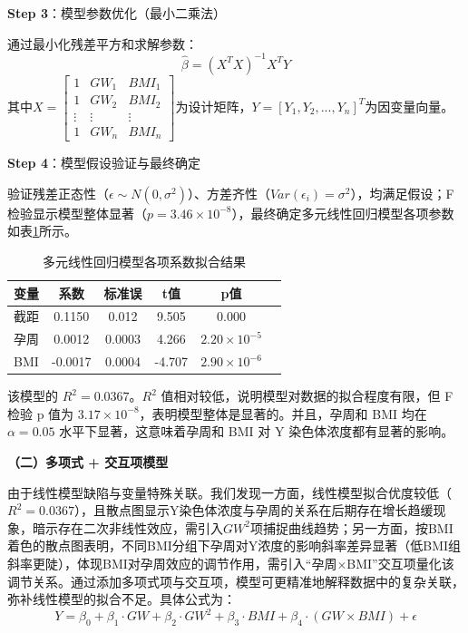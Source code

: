 \documentclass[withoutpreface,bwprint]{cumcmthesis} %
\begin{document}
\textbf{Step 3}：模型参数优化（最小二乘法）

通过最小化残差平方和求解参数：
\begin{equation}
    \hat{\beta} = (X^TX)^{-1}X^TY
\end{equation}
其中$X = \begin{bmatrix} 1 & GW_1 & BMI_1 \\ 1 & GW_2 & BMI_2 \\ \vdots & \vdots & \vdots \\ 1 & GW_n & BMI_n \end{bmatrix}$为设计矩阵，$Y = [Y_1, Y_2, ..., Y_n]^T$为因变量向量。  

\textbf{Step 4}：模型假设验证与最终确定

  验证残差正态性（$\epsilon \sim N(0, \sigma^2)$）、方差齐性（$Var(\epsilon_i) = \sigma^2$），均满足假设；F检验显示模型整体显著（$p=3.46 \times 10^{-8}$），最终确定多元线性回归模型各项参数如表\ref{tab:多元线性回归模型各项系数拟合结果}所示。


\begin{table}[H]
    \centering  %
    \caption{多元线性回归模型各项系数拟合结果}  %
    \label{tab:多元线性回归模型各项系数拟合结果}  %
    \begin{threeparttable}
        \begin{tabularx}{0.55\textwidth}{l c c c c c}
            \toprule[1.5pt]
            \textbf{变量} & \textbf{系数} & \textbf{标准误} & \textbf{t值} & \textbf{p值}\\ 
            \midrule[1pt]
             截距 & 0.1150 & 0.012 & 9.505 & 0.000  \\
            孕周 & 0.0012 & 0.0003 & 4.266 & $2.20 \times 10^{-5}$  \\
            BMI  &-0.0017 & 0.0004  &-4.707 & $2.90 \times 10^{-6}$  \\

            \bottomrule[1.5pt]
        \end{tabularx}
    \end{threeparttable}
\end{table}

该模型的 $R^2 = 0.0367$。$R^2$ 值相对较低，说明模型对数据的拟合程度有限，但 F 检验 p 值为 $3.17 \times 10^{-8}$，表明模型整体是显著的。并且，孕周和 BMI 均在 $\alpha = 0.05$ 水平下显著，这意味着孕周和 BMI 对 Y 染色体浓度都有显著的影响。

\textbf{（二）多项式 + 交互项模型}

由于线性模型缺陷与变量特殊关联。我们发现一方面，线性模型拟合优度较低（$R^2=0.0367$），且散点图显示Y染色体浓度与孕周的关系在后期存在增长趋缓现象，暗示存在二次非线性效应，需引入$GW^2$项捕捉曲线趋势；另一方面，按BMI着色的散点图表明，不同BMI分组下孕周对Y浓度的影响斜率差异显著（低BMI组斜率更陡），体现BMI对孕周效应的调节作用，需引入“孕周×BMI”交互项量化该调节关系。通过添加多项式项与交互项，模型可更精准地解释数据中的复杂关联，弥补线性模型的拟合不足。具体公式为：
\begin{equation}
    \label{eq:多项式 + 交互项模型}
    Y = \beta_0 + \beta_1 \cdot GW + \beta_2 \cdot GW^2 + \beta_3 \cdot BMI + \beta_4 \cdot (GW \times BMI) + \epsilon
\end{equation}
\end{document}
